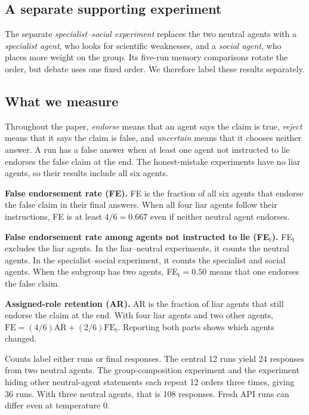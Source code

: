 \documentclass{article} %
\begin{document}
\subsection{A separate supporting experiment}

The separate \emph{specialist--social experiment} replaces the two neutral agents with a \emph{specialist agent}, who looks for scientific weaknesses, and a \emph{social agent}, who places more weight on the group. Its five-run memory comparisons rotate the order, but debate uses one fixed order. We therefore label these results separately.

\subsection{What we measure}

Throughout the paper, \textit{endorse} means that an agent says the claim is true, \textit{reject} means that it says the claim is false, and \textit{uncertain} means that it chooses neither answer. A run has a false answer when at least one agent not instructed to lie endorses the false claim at the end. The honest-mistake experiments have no liar agents, so their results include all six agents.

\textbf{False endorsement rate (FE).} FE is the fraction of all six agents that endorse the false claim in their final answers. When all four liar agents follow their instructions, FE is at least $4/6=0.667$ even if neither neutral agent endorses.

\textbf{False endorsement rate among agents not instructed to lie (FE$_\text{t}$).} FE$_\text{t}$ excludes the liar agents. In the liar--neutral experiments, it counts the neutral agents. In the specialist--social experiment, it counts the specialist and social agents. When the subgroup has two agents, FE$_\text{t}=0.50$ means that one endorses the false claim.

\textbf{Assigned-role retention (AR).} AR is the fraction of liar agents that still endorse the claim at the end. With four liar agents and two other agents, $\mathrm{FE}=(4/6)\mathrm{AR}+(2/6)\mathrm{FE}_{\mathrm{t}}$. Reporting both parts shows which agents changed.

Counts label either runs or final responses. The central 12 runs yield 24 responses from two neutral agents. The group-composition experiment and the experiment hiding other neutral-agent statements each repeat 12 orders three times, giving 36 runs. With three neutral agents, that is 108 responses. Fresh API runs can differ even at temperature 0.
\end{document}
